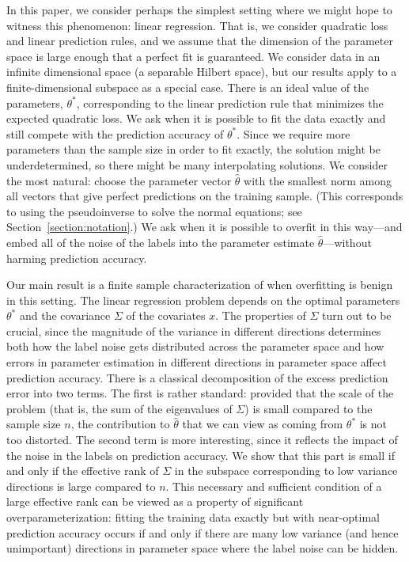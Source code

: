 \documentclass[11pt,notitlepage]{article}
\begin{document}
In this paper, we consider perhaps the simplest setting where we
might hope to witness this phenomenon: linear regression.
That is, we consider quadratic loss and linear prediction rules, and
we assume that the dimension of the parameter space is large enough
that a perfect fit is guaranteed. We consider data in an infinite
dimensional space (a separable Hilbert space), but our results
apply to a finite-dimensional subspace as a special case. There
is an ideal value of the parameters, $\theta^*$, corresponding to
the linear prediction rule that minimizes the expected quadratic loss.
We ask when it is possible to fit the data exactly
and still compete with the prediction accuracy of $\theta^*$.
Since we require more parameters than the sample size in order to
fit exactly, the solution might be underdetermined, so there might
be many interpolating solutions. We consider the most natural: 
choose the parameter vector $\hat\theta$ with the smallest norm
among all vectors that give perfect predictions on the training
sample. (This corresponds to using the pseudoinverse to solve
the normal equations; see Section~\ref{section:notation}.)
We ask when it is possible to overfit in this
way---and embed all of the noise of the labels into the parameter
estimate $\hat\theta$---without harming prediction accuracy.

Our main result is a finite sample characterization of when
overfitting is benign in this setting. The linear regression
problem depends on the optimal parameters $\theta^*$ and the
covariance $\Sigma$ of the covariates $x$. The properties of $\Sigma$
turn out to be crucial, since the magnitude of the variance in
different directions determines both how the label noise gets
distributed across the parameter space and how errors in
parameter estimation in different directions in parameter space
affect prediction accuracy. There is a classical decomposition of
the excess prediction error into two terms. The
first is rather standard: provided that the scale of the problem
(that is, the sum of the eigenvalues of $\Sigma$) is small compared
to the sample size $n$, the contribution to $\hat\theta$ that we can
view as coming from $\theta^*$ is not too distorted. The second
term is more interesting, since it reflects the impact of the noise
in the labels on prediction accuracy.
We show that this part is small if and only if the
effective rank of $\Sigma$ in the subspace corresponding to low
variance directions is large compared to $n$.  This necessary
and sufficient condition of a large effective rank can be viewed
as a property of significant overparameterization: fitting the
training data exactly but with near-optimal prediction accuracy
occurs if and only if there are many low variance (and hence
unimportant) directions in parameter space where the label
noise can be hidden.
\end{document}
